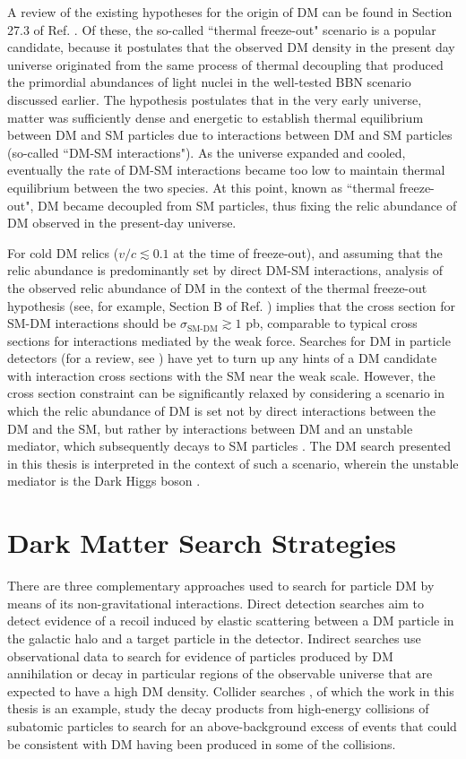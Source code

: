 A review of the existing hypotheses for the origin of DM can be found in Section 27.3 of Ref. \cite{pdg_2020}. Of these, the so-called ``thermal freeze-out" scenario is a popular candidate, because it postulates that the observed DM density in the present day universe originated from the same process of thermal decoupling that produced the primordial abundances of light nuclei in the well-tested BBN scenario discussed earlier. The hypothesis postulates that in the very early universe, matter was sufficiently dense and energetic to establish thermal equilibrium between DM and SM particles due to interactions between DM and SM particles (so-called ``DM-SM interactions"). As the universe expanded and cooled, eventually the rate of DM-SM interactions became too low to maintain thermal equilibrium between the two species. At this point, known as ``thermal freeze-out", DM became decoupled from SM particles, thus fixing the relic abundance of DM observed in the present-day universe. 

For cold DM relics (\(v/c\lesssim0.1\) at the time of freeze-out), and assuming that the relic abundance is predominantly set by direct DM-SM interactions, analysis of the observed relic abundance of DM in the context of the thermal freeze-out hypothesis (see, for example, Section B of Ref. \cite{dm_xsec_2015}) implies that the cross section for SM-DM interactions should be \(\sigma_\text{SM-DM}\gtrsim1\) pb, comparable to typical cross sections for interactions mediated by the weak force. Searches for DM in particle detectors (for a review, see \cite{wimp_searches_2018}) have yet to turn up any hints of a DM candidate with interaction cross sections with the SM near the weak scale. However, the cross section constraint can be significantly relaxed by considering a scenario in which the relic abundance of DM is set not by direct interactions between the DM and the SM, but rather by interactions between DM and an unstable mediator, which subsequently decays to SM particles \cite{secluded_dm_2008}. The DM search presented in this thesis is interpreted in the context of such a scenario, wherein the unstable mediator is the Dark Higgs boson \cite{Duerr_2016,Duerr2017}.

\section{Dark Matter Search Strategies}

There are three complementary approaches used to search for particle DM by means of its non-gravitational interactions. Direct detection searches \cite{billard2021direct} aim to detect evidence of a recoil induced by elastic scattering between a DM particle in the galactic halo and a target particle in the detector. Indirect searches \cite{CIRELLI_2012, conrad} use observational data to search for evidence of particles produced by DM annihilation or decay in particular regions of the observable universe that are expected to have a high DM density. Collider searches \cite{DM_colliders}, of which the work in this thesis is an example, study the decay products from high-energy collisions of subatomic particles to search for an above-background excess of events that could be consistent with DM having been produced in some of the collisions.

